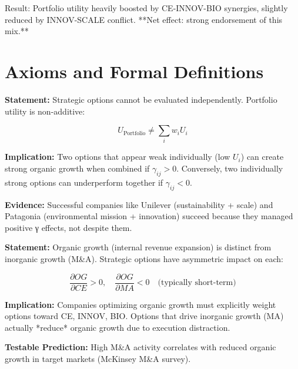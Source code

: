 Result: Portfolio utility heavily boosted by CE-INNOV-BIO synergies, slightly reduced by INNOV-SCALE conflict. **Net effect: strong endorsement of this mix.**

\section{Axioms and Formal Definitions}
\label{sec:socm-axioms}

\begin{tcolorbox}[colback=gray!5!white, colframe=gray!75!black,
    title=Axiom SOCM-1: Complementarity Necessity in Strategy Combinations]

\textbf{Statement:} Strategic options cannot be evaluated independently. Portfolio utility is non-additive:

\begin{equation}
U_{\text{Portfolio}} \neq \sum_i w_i U_i
\end{equation}

\textbf{Implication:} Two options that appear weak individually (low $U_i$) can create strong organic growth when combined if $\gamma_{ij} > 0$. Conversely, two individually strong options can underperform together if $\gamma_{ij} < 0$.

\textbf{Evidence:} Successful companies like Unilever (sustainability + scale) and Patagonia (environmental mission + innovation) succeed because they managed positive γ effects, not despite them.

\end{tcolorbox}

\begin{tcolorbox}[colback=gray!5!white, colframe=gray!75!black,
    title=Axiom SOCM-2: Organic Growth as Distinct Metric]

\textbf{Statement:} Organic growth (internal revenue expansion) is distinct from inorganic growth (M\&A). Strategic options have asymmetric impact on each:

\begin{equation}
\frac{\partial OG}{\partial CE} > 0, \quad \frac{\partial OG}{\partial MA} < 0 \quad \text{(typically short-term)}
\end{equation}

\textbf{Implication:} Companies optimizing organic growth must explicitly weight options toward CE, INNOV, BIO. Options that drive inorganic growth (MA) actually *reduce* organic growth due to execution distraction.

\textbf{Testable Prediction:} High M\&A activity correlates with reduced organic growth in target markets (McKinsey M\&A survey).

\end{tcolorbox}

